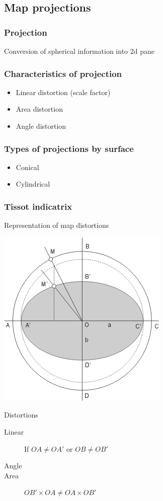 \documentclass[17pt]{beamer}
\begin{document}
\subsection{Map projections}

\begin{frame}
  \frametitle{Projection}
  Conversion of spherical information into 2d pane
\end{frame}

\begin{frame}
  \frametitle{Characteristics of projection}
  \begin{itemize}
  \item Linear distortion (scale factor)
  \item Area distortion
  \item Angle distortion
  \end{itemize}
\end{frame}

\begin{frame}
  \frametitle{Types of projections by surface}
  \begin{itemize}
  \item Conical
  \item Cylindrical
  \end{itemize}
\end{frame}

\begin{frame}
  \frametitle{Tissot indicatrix}
  \begin{block}{Representation of map distortions}
    \begin{center}
      \includegraphics[scale=0.5]{pycon-2011-tutorial-files/indicatrix.png}
    \end{center}
  \end{block}
  \begin{block}{Distortions}
    \begin{description}
    \item[Linear] If $OA \neq OA'$ or $OB \neq OB'$
    \item[Angle]
    \item[Area] $OB' \times OA \neq OA \times OB'$
    \end{description}

  \end{block}
\end{frame}
\end{document}
